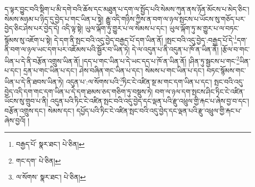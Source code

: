 ད་ལྟར་བྱུང་བའི་སྡིག་པ་མི་དགེ་བའི་ཆོས་དང་མཐུན་པ་དག་ལ་སྤྱོད་པའི་སེམས་ཀུན་ནས་ཉོན་མོངས་པ་མེད་ཅིང་། སེམས་མཉམ་པ་ཉིད་དུ་བྱེད་པ་གང་ཡིན་པ་སྟེ། རྒྱུ་འདི་གཉིས་ཀྱིས་ན་བག་ལ་ཉལ་སྤངས་པ་ཡོངས་སུ་གཅོད་པར་བྱེད་ཅིང་ཤེས་པར་བྱེད་དེ། འདི་ལྟ་སྟེ། ཡུལ་ལྐོག་ཏུ་གྱུར་པ་ལ་སེམས་པ་དང་། ཡུལ་ལྐོག་ཏུ་མ་གྱུར་པ་ལ་བཏང་སྙོམས་སུ་འཇོག་པ་སྟེ། དེ་དག་ནི་སྤང་བའི་འདུ་བྱེད་བརྒྱད་པོ་དག་ཡིན་ནོ། །སྤང་བའི་འདུ་བྱེད་:བརྒྱད་པོ་དེ་\footnote{བརྒྱད་པོ་  སྣར་ཐང་།  པེ་ཅིན། }དག་ནི་བག་ལ་ཉལ་ཡང་དག་པར་འཇོམས་པའི་སྦྱོར་བ་ཡིན་ཏེ། དེ་ལ་འདུན་པ་ནི་འདུན་པ་ཁོ་ན་ཡིན་ནོ། །རྩོལ་བ་གང་ཡིན་པ་དེ་ནི་བརྩོན་འགྲུས་ཡིན་ནོ། །དད་པ་གང་ཡིན་པ་དེ་ཡང་དད་པ་ཁོ་ན་ཡིན་ནོ། །ཤིན་ཏུ་སྦྱངས་པ་གང་\footnote{གང་དག་  པེ་ཅིན། }ཡིན་པ་དང་། དྲན་པ་གང་ཡིན་པ་དང་། ཤེས་བཞིན་གང་ཡིན་པ་དང་། སེམས་པ་གང་ཡིན་པ་དང་། བཏང་སྙོམས་གང་ཡིན་པ་དེ་ནི་ཐབས་ཡིན་ཏེ། འདུན་པ་:ལ་སོགས་པའི་\footnote{ལ་སོགས་  སྣར་ཐང་།  པེ་ཅིན། }ཏིང་ངེ་འཛིན་སྔ་མ་གང་དག་ཡིན་པ་དང་། སྤང་བའི་འདུ་བྱེད་འདི་དག་གང་དག་ཡིན་པ་དེ་དག་ཐམས་ཅད་གཅིག་ཏུ་བསྡུས་ཏེ། བག་ལ་ཉལ་དག་སྤངས་ཤིང་ཏིང་ངེ་འཛིན་ཡོངས་སུ་གྲུབ་པ་ནི། འདུན་པའི་ཏིང་ངེ་འཛིན་སྤང་བའི་འདུ་བྱེད་དང་ལྡན་པའི་རྫུ་འཕྲུལ་གྱི་རྐང་པ་ཞེས་བྱ་བ་དང་། བརྩོན་འགྲུས་དང་། སེམས་དང་། དཔྱོད་པའི་ཏིང་ངེ་འཛིན་སྤང་བའི་འདུ་བྱེད་དང་ལྡན་པའི་རྫུ་འཕྲུལ་གྱི་རྐང་པ་ཞེས་བྱའོ། །
